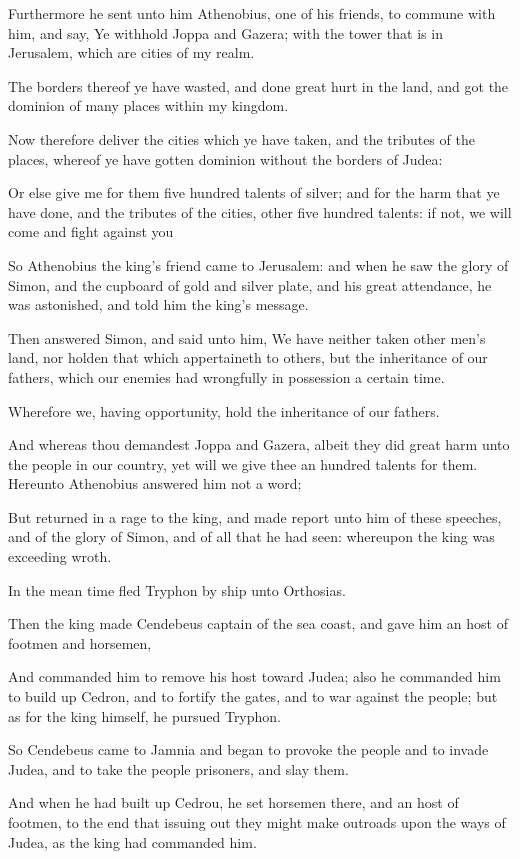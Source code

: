 {\par }{\PP {}Furthermore he sent unto him Athenobius, one of his friends, to commune with him, and say, Ye withhold Joppa and Gazera; with the tower that is in Jerusalem, which are cities of my realm.
\par }{\PP {}The borders thereof ye have wasted, and done great hurt in the land, and got the dominion of many places within my kingdom.
\par }{\PP {}Now therefore deliver the cities which ye have taken, and the tributes of the places, whereof ye have gotten dominion without the borders of Judea:
\par }{\PP {}Or else give me for them five hundred talents of silver; and for the harm that ye have done, and the tributes of the cities, other five hundred talents: if not, we will come and fight against you
\par }{\PP {}So Athenobius the king’s friend came to Jerusalem: and when he saw the glory of Simon, and the cupboard of gold and silver plate, and his great attendance, he was astonished, and told him the king’s message.
\par }{\PP {}Then answered Simon, and said unto him, We have neither taken other men’s land, nor holden that which appertaineth to others, but the inheritance of our fathers, which our enemies had wrongfully in possession a certain time.
\par }{\PP {}Wherefore we, having opportunity, hold the inheritance of our fathers.
\par }{\PP {}And whereas thou demandest Joppa and Gazera, albeit they did great harm unto the people in our country, yet will we give thee an hundred talents for them. Hereunto Athenobius answered him not a word;
\par }{\PP {}But returned in a rage to the king, and made report unto him of these speeches, and of the glory of Simon, and of all that he had seen: whereupon the king was exceeding wroth.
\par }{\PP {}In the mean time fled Tryphon by ship unto Orthosias.
\par }{\PP {}Then the king made Cendebeus captain of the sea coast, and gave him an host of footmen and horsemen,
\par }{\PP {}And commanded him to remove his host toward Judea; also he commanded him to build up Cedron, and to fortify the gates, and to war against the people; but as for the king himself, he pursued Tryphon.
\par }{\PP {}So Cendebeus came to Jamnia and began to provoke the people and to invade Judea, and to take the people prisoners, and slay them.
\par }{\PP {}And when he had built up Cedrou, he set horsemen there, and an host of footmen, to the end that issuing out they might make outroads upon the ways of Judea, as the king had commanded him.

}
